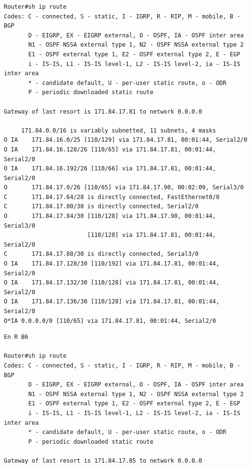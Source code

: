 \documentclass[11pt]{article}
\begin{document}
\begin{enumerate}
\begin{mdframed}
\begin{verbatim}
Router#sh ip route 
Codes: C - connected, S - static, I - IGRP, R - RIP, M - mobile, B - BGP
       D - EIGRP, EX - EIGRP external, O - OSPF, IA - OSPF inter area
       N1 - OSPF NSSA external type 1, N2 - OSPF NSSA external type 2
       E1 - OSPF external type 1, E2 - OSPF external type 2, E - EGP
       i - IS-IS, L1 - IS-IS level-1, L2 - IS-IS level-2, ia - IS-IS inter area
       * - candidate default, U - per-user static route, o - ODR
       P - periodic downloaded static route

Gateway of last resort is 171.84.17.81 to network 0.0.0.0

     171.84.0.0/16 is variably subnetted, 11 subnets, 4 masks
O IA    171.84.16.0/25 [110/129] via 171.84.17.81, 00:01:44, Serial2/0
O IA    171.84.16.128/26 [110/65] via 171.84.17.81, 00:01:44, Serial2/0
O IA    171.84.16.192/26 [110/66] via 171.84.17.81, 00:01:44, Serial2/0
O       171.84.17.0/26 [110/65] via 171.84.17.90, 00:02:09, Serial3/0
C       171.84.17.64/28 is directly connected, FastEthernet0/0
C       171.84.17.80/30 is directly connected, Serial2/0
O       171.84.17.84/30 [110/128] via 171.84.17.90, 00:01:44, Serial3/0
                        [110/128] via 171.84.17.81, 00:01:44, Serial2/0
C       171.84.17.88/30 is directly connected, Serial3/0
O IA    171.84.17.128/30 [110/192] via 171.84.17.81, 00:01:44, Serial2/0
O IA    171.84.17.132/30 [110/128] via 171.84.17.81, 00:01:44, Serial2/0
O IA    171.84.17.136/30 [110/128] via 171.84.17.81, 00:01:44, Serial2/0
O*IA 0.0.0.0/0 [110/65] via 171.84.17.81, 00:01:44, Serial2/0
\end{verbatim}
\end{mdframed}

\begin{mdframed}
\begin{verbatim}
En R B6

Router#sh ip route 
Codes: C - connected, S - static, I - IGRP, R - RIP, M - mobile, B - BGP
       D - EIGRP, EX - EIGRP external, O - OSPF, IA - OSPF inter area
       N1 - OSPF NSSA external type 1, N2 - OSPF NSSA external type 2
       E1 - OSPF external type 1, E2 - OSPF external type 2, E - EGP
       i - IS-IS, L1 - IS-IS level-1, L2 - IS-IS level-2, ia - IS-IS inter area
       * - candidate default, U - per-user static route, o - ODR
       P - periodic downloaded static route

Gateway of last resort is 171.84.17.85 to network 0.0.0.0


\end{verbatim}
\end{mdframed}
\end{enumerate}
\end{document}
